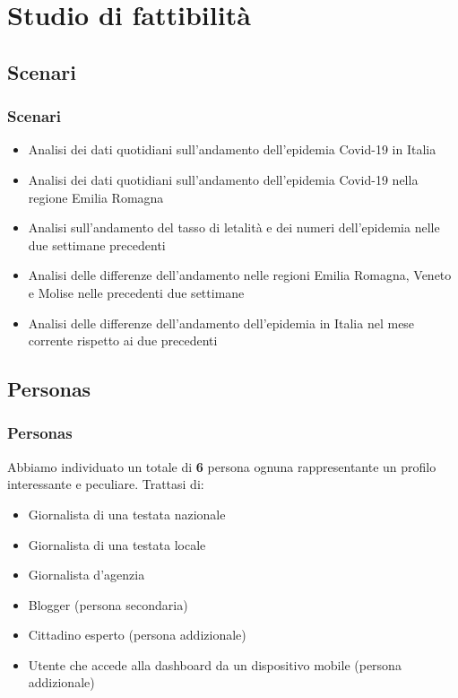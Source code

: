 \documentclass[handout]{beamer}
\begin{document}
	\section{Studio di fattibilità}
		\subsection{Scenari}
		\begin{frame}
			\frametitle{Scenari}
			\begin{itemize}[<+->]
				\item Analisi dei dati quotidiani sull'andamento dell'epidemia Covid-19 in Italia\\
				\item Analisi dei dati quotidiani sull'andamento dell'epidemia Covid-19 nella regione Emilia Romagna\\
				\item Analisi sull'andamento del tasso di letalità e dei numeri dell'epidemia nelle due settimane precedenti\\
				\item Analisi delle differenze dell'andamento nelle regioni Emilia Romagna, Veneto e Molise nelle precedenti due settimane\\
				\item Analisi delle differenze dell'andamento dell'epidemia in Italia nel mese corrente rispetto ai due precedenti\\
			\end{itemize}
		\end{frame}

		\subsection{Personas}
		\begin{frame}
			\frametitle{Personas}
			Abbiamo individuato un totale di \textbf{6} persona ognuna rappresentante un profilo interessante e peculiare. Trattasi di:
			\begin{itemize}[<+->]
				\item Giornalista di una testata nazionale\\
				\item Giornalista di una testata locale\\
				\item Giornalista d'agenzia\\
				\item Blogger (persona secondaria)\\
				\item Cittadino esperto (persona addizionale)\\
				\item Utente che accede alla dashboard da un dispositivo mobile (persona addizionale)\\
			\end{itemize}
		\end{frame}
\end{document}
